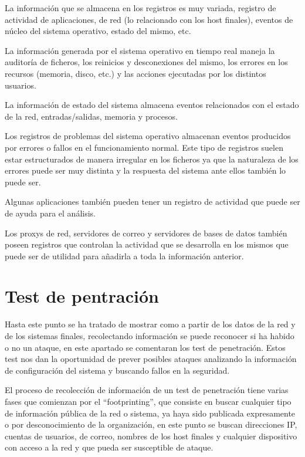 La información que se almacena en los registros es muy variada, registro de actividad de aplicaciones, de red (lo relacionado con los host finales), eventos de núcleo del sistema operativo, estado del mismo, etc.
\bigskip

La información generada por el sistema operativo en tiempo real maneja la auditoría de ficheros, los reinicios y desconexiones del mismo, los errores en los recursos (memoria, disco, etc.) y las acciones ejecutadas por los distintos usuarios.
\bigskip

La información de estado del sistema almacena eventos relacionados con el estado de la red, entradas/salidas, memoria y procesos.
\bigskip

Los registros de problemas del sistema operativo almacenan eventos producidos por errores o fallos en el funcionamiento normal. Este tipo de registros suelen estar estructurados de manera irregular en los ficheros ya que la naturaleza de los errores puede ser muy distinta y la respuesta del sistema ante ellos también lo puede ser.
\bigskip

Algunas aplicaciones también pueden tener un registro de actividad que puede ser de ayuda para el análisis.
\bigskip

Los proxys de red, servidores de correo y servidores de bases de datos también poseen registros que controlan la actividad que se desarrolla en los mismos que puede ser de utilidad para añadirla a toda la información anterior.
\bigskip

\section{Test de pentración}\cite{PCK} \cite{MPP}
Hasta este punto se ha tratado de mostrar como a partir de los datos de la red y de los sistemas finales, recolectando información se puede reconocer si ha habido o no un ataque, en este apartado se comentaran los test de penetración. Estos test nos dan la oportunidad de prever posibles ataques analizando la información de configuración del sistema y buscando fallos en la seguridad.
\bigskip

El proceso de recolección de información de un test de penetración tiene varias fases que comienzan por el “footprinting”, que consiste en buscar cualquier tipo de información pública de la red o sistema, ya haya sido publicada expresamente o por desconocimiento de la organización, en este punto se buscan direcciones IP, cuentas de usuarios, de correo, nombres de los host finales y cualquier dispositivo con acceso a la red y que pueda ser susceptible de ataque.
\bigskip

